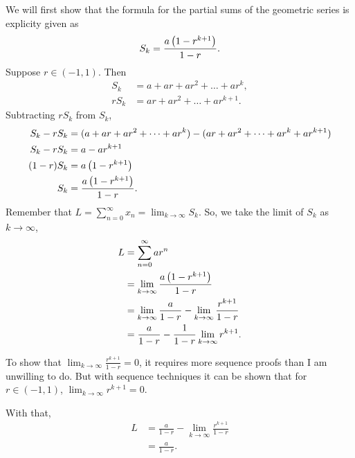 \documentclass[12pt]{article}
\theoremstyle{definition}
\renewenvironment{proof}[1][\proofname]{\vspace{-10pt}\begin{replacementproof}}{\end{replacementproof}}
\begin{document}
            \begin{proof}
                We will first show that the formula for the partial sums of the geometric series is explicity given as
                \begin{equation*}
                    S_{k} = \frac{a\left(1 - r^{k + 1}\right)}{1 - r}.
                \end{equation*}
                Suppose $r \in (-1, 1)$. Then
                \begin{align*}
                    S_{k} &= a + ar + ar^{2} + \dots + ar^{k}, \\
                    rS_{k} &= ar + ar^{2} + \dots + ar^{k + 1}.
                \end{align*}
                Subtracting $rS_{k}$ from $S_{k}$,
                \begin{align*}
                    S_{k} - rS_{k} &= (a + ar + ar^{2} + \dots + ar^{k}) - (ar + ar^{2} + \dots + ar^{k} + ar^{k + 1}) \\
                    S_{k} - rS_{k} &= a - ar^{k + 1} \\
                    (1 - r)S_{k} &= a\left(1 - r^{k + 1}\right) \\
                    S_{k} &= \frac{a\left(1 - r^{k + 1}\right)}{1 - r}.
                \end{align*}
                Remember that $L = \sum_{n = 0}^{\infty}x_{n} = \lim_{k \rightarrow \infty}S_{k}$.
                So, we take the limit of $S_{k}$ as $k \rightarrow \infty$,
                \begin{align*}
                   L &= \sum_{n = 0}^{\infty}ar^{n} \\
                     &= \lim_{k \rightarrow \infty}\frac{a\left(1 - r^{k + 1}\right)}{1 - r} \\
                     &= \lim_{k \rightarrow \infty}\frac{a}{1 - r} - \lim_{k \rightarrow \infty}\frac{r^{k + 1}}{1 - r} \\
                     &= \frac{a}{1 - r} - \frac{1}{1 - r}\lim_{k \rightarrow \infty}r^{k + 1}.
                \end{align*}
                \begin{note}
                    To show that $\lim_{k \rightarrow \infty}\frac{r^{k + 1}}{1 - r} = 0$, it requires more sequence proofs than I am unwilling to do. But with sequence techniques it can be shown that for $r \in (-1, 1)$, $\lim_{k \rightarrow \infty}r^{k + 1} = 0$. 
                \end{note}

                With that,
                \begin{align*}
                    L &= \frac{a}{1 - r} - \lim_{k \rightarrow \infty}\frac{r^{k + 1}}{1 - r} \\
                      &= \frac{a}{1 - r}.
                \end{align*}
            \end{proof}
\end{document}

